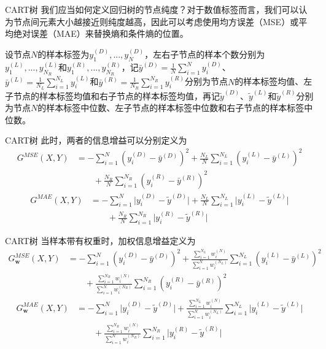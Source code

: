 \documentclass{ctexbeamer}        %
\begin{document}
\begin{frame}{CART树}
我们应当如何定义回归树的节点纯度？对于数值标签而言，我们可以认为节点间元素大小越接近则纯度越高，因此可以考虑使用均方误差（MSE）或平均绝对误差（MAE）来替换熵和条件熵的位置。
\newline

设节点$N$的样本标签为$y^{(D)}_1,...,y^{(D)}_N$，左右子节点的样本个数分别为$y^{(L)}_1,...,y^{(L)}_{N_R}$和$y^{(R)}_1,...,y^{(R)}_{N_R}$，记$\bar{y}^{(D)}=\frac{1}{N}\sum_{i=1}^{N}y^{(D)}_i$、$\bar{y}^{(L)}=\frac{1}{N_L}\sum_{i=1}^{N_L}y^{(L)}_i$和$\bar{y}^{(R)}=\frac{1}{N_R}\sum_{i=1}^{N_R}y^{(R)}_i$分别为节点$N$的样本标签均值、左子节点的样本标签均值和右子节点的样本标签均值，再记$\tilde{y}^{(D)}$、$\tilde{y}^{(L)}$和$\tilde{y}^{(R)}$分别为节点$N$的样本标签中位数、左子节点的样本标签中位数和右子节点的样本标签中位数。
\end{frame}
\begin{frame}{CART树}
此时，两者的信息增益可以分别定义为
\begin{align*}
G^{MSE}(X,Y)&=-\sum_{i=1}^{N}(y^{(D)}_i-\bar{y}^{(D)})^2+\frac{N_L}{N}\sum_{i=1}^{N_L}(y^{(L)}_i-\bar{y}^{(L)})^2\\
&\qquad+\frac{N_R}{N}\sum_{i=1}^{N_R}(y^{(R)}_i-\bar{y}^{(R)})^2
\end{align*}
\begin{align*}
G^{MAE}(X,Y)&=-\sum_{i=1}^{N}\vert y^{(D)}_i-\tilde{y}^{(D)}\vert+\frac{N_L}{N}\sum_{i=1}^{N_L}\vert y^{(L)}_i-\tilde{y}^{(L)}\vert\\
&\qquad+\frac{N_R}{N}\sum_{i=1}^{N_R}\vert y^{(R)}_i-\tilde{y}^{(R)}\vert
\end{align*}
\end{frame}

\begin{frame}{CART树}
当样本带有权重时，加权信息增益定义为
\begin{align*}
G_{\mathbf{w}}^{MSE}(X,Y)&=-\sum_{i=1}^{N}(y^{(D)}_i-\bar{y}^{(D)})^2+\frac{\sum_{i=1}^{N_L}w^{(N)}_i}{\sum_{i=1}^{N}w^{(N_L)}_i}\sum_{i=1}^{N_L}(y^{(L)}_i-\bar{y}^{(L)})^2\\
&\qquad+\frac{\sum_{i=1}^{N_R}w^{(N)}_i}{\sum_{i=1}^{N}w^{(N_R)}_i}\sum_{i=1}^{N_R}(y^{(R)}_i-\bar{y}^{(R)})^2
\end{align*}
\begin{align*}
G_{\mathbf{w}}^{MAE}(X,Y)&=-\sum_{i=1}^{N}\vert y^{(D)}_i-\tilde{y}^{(D)}\vert+\frac{\sum_{i=1}^{N_L}w^{(N)}_i}{\sum_{i=1}^{N}w^{(N_L)}_i}\sum_{i=1}^{N_L}\vert y^{(L)}_i-\tilde{y}^{(L)}\vert\\
&\qquad+\frac{\sum_{i=1}^{N_R}w^{(N)}_i}{\sum_{i=1}^{N}w^{(N_R)}_i}\sum_{i=1}^{N_R}\vert y^{(R)}_i-\tilde{y}^{(R)}\vert
\end{align*}
\end{frame}
\end{document}
